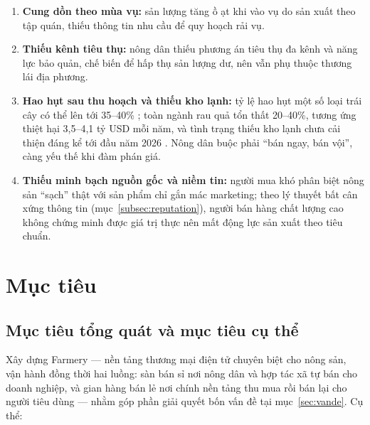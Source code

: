 \begin{enumerate}
    \item[\textbf{V1.}] \textbf{Cung dồn theo mùa vụ:} sản lượng tăng ồ ạt khi vào vụ do sản xuất theo tập quán, thiếu thông tin nhu cầu để quy hoạch rải vụ.
    \item[\textbf{V2.}] \textbf{Thiếu kênh tiêu thụ:} nông dân thiếu phương án tiêu thụ đa kênh và năng lực bảo quản, chế biến để hấp thụ sản lượng dư, nên vẫn phụ thuộc thương lái địa phương.
    \item[\textbf{V3.}] \textbf{Hao hụt sau thu hoạch và thiếu kho lạnh:} tỷ lệ hao hụt một số loại trái cây có thể lên tới 35--40\% \parencite{theleader_2024}; toàn ngành rau quả tổn thất 20--40\%, tương ứng thiệt hại 3,5--4,1 tỷ USD mỗi năm, và tình trạng thiếu kho lạnh chưa cải thiện đáng kể tới đầu năm 2026 \parencite{tuoitre_2026}. Nông dân buộc phải ``bán ngay, bán vội'', càng yếu thế khi đàm phán giá.
    \item[\textbf{V4.}] \textbf{Thiếu minh bạch nguồn gốc và niềm tin:} người mua khó phân biệt nông sản ``sạch'' thật với sản phẩm chỉ gắn mác marketing; theo lý thuyết bất cân xứng thông tin (mục~\ref{subsec:reputation}), người bán hàng chất lượng cao không chứng minh được giá trị thực nên mất động lực sản xuất theo tiêu chuẩn.
\end{enumerate}

\section{Mục tiêu}
\label{sec:muctieu}

\subsection{Mục tiêu tổng quát và mục tiêu cụ thể}

Xây dựng Farmery --- nền tảng thương mại điện tử chuyên biệt cho nông sản, vận hành đồng thời hai luồng: sàn bán sỉ nơi nông dân và hợp tác xã tự bán cho doanh nghiệp, và gian hàng bán lẻ nơi chính nền tảng thu mua rồi bán lại cho người tiêu dùng --- nhằm góp phần giải quyết bốn vấn đề tại mục~\ref{sec:vande}. Cụ thể:

